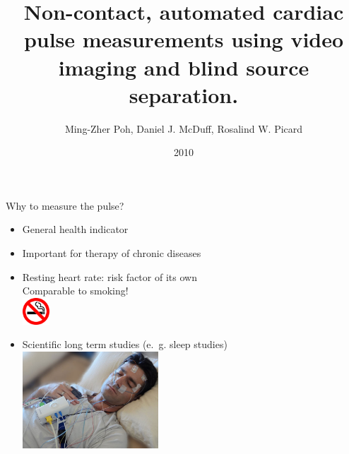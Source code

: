 \documentclass{beamer}
\title{Non-contact, automated cardiac pulse measurements using video imaging and blind source separation.}
\author{Ming-Zher Poh, Daniel J. McDuff, Rosalind W. Picard}
\date{2010}
\begin{document}
\newcommand{\mytitle}[1]{{\Large{\underline{#1}}}}
\newcommand{\positiveaspect}{\textcolor{green}{$\oplus$}}
\newcommand{\negativeaspect}{\textcolor{red}{$\ominus$}}

\frame{\titlepage}

\begin{frame}{Why to measure the pulse?}
\begin{itemize}
	\item General health indicator \pause
	\item Important for therapy of chronic diseases \pause
	\item Resting heart rate: risk factor of its own\\ \pause
		Comparable to smoking!\\
		\includegraphics[width=1cm]{No_Smoking} \pause
	\item Scientific long term studies (e.~g. sleep studies)\\
		\includegraphics[width=0.4\textwidth]{Sleep-lab-facilities.jpg}
\end{itemize}
\end{frame}
\end{document}
